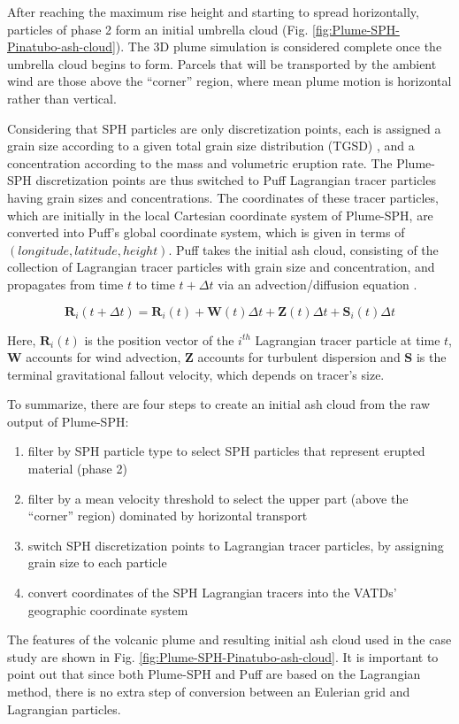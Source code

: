 \documentclass[draft,linenumbers]{agujournal2019}
\begin{document}
After reaching the maximum rise height and starting to spread horizontally, particles of phase 2 form an initial umbrella cloud (Fig. \ref{fig:Plume-SPH-Pinatubo-ash-cloud}). The 3D plume simulation is considered complete once the umbrella cloud begins to form. Parcels that will be transported by the ambient wind are those above the ``corner'' region, where mean plume motion is horizontal rather than vertical.  

Considering that SPH particles are only discretization points, each is assigned a grain size according to a given total grain size distribution (TGSD) \citep{paladio1996tephra}, and a concentration according to the mass and volumetric eruption rate. The Plume-SPH discretization points are thus switched to Puff Lagrangian tracer particles having grain sizes and concentrations. The coordinates of these tracer particles, which are initially in the local Cartesian coordinate system of Plume-SPH, are converted into Puff's global coordinate system, which is given in terms of $(longitude, latitude, height)$. Puff takes the initial ash cloud, consisting of the collection of Lagrangian tracer particles with grain size and concentration, and propagates from time $t$ to time $t+\Delta t$ via an advection/diffusion equation \citep{searcy1998puff}.
\begin{linenomath*}
\begin{equation}
\textbf{R}_i(t+\Delta t) = \textbf{R}_i(t) + \textbf{W}(t)\Delta t + \textbf{Z}(t)\Delta t +  \textbf{S}_i(t) \Delta t
\end{equation}
\end{linenomath*}
Here, $\textbf{R}_i(t)$ is the position vector of the $i^{th}$ Lagrangian tracer particle at time $t$, $\textbf{W}$ accounts for wind advection, $\textbf{Z}$ accounts for turbulent dispersion and $\textbf{S}$ is the terminal gravitational fallout velocity, which depends on tracer's size.

To summarize, there are four steps to create an initial ash cloud from the raw output of Plume-SPH:
\begin{enumerate}
\item filter by SPH particle type to select SPH particles that represent erupted material (phase 2)
\item filter by a mean velocity threshold to select the upper part (above the ``corner'' region) dominated by horizontal transport
\item switch SPH discretization points to Lagrangian tracer particles, by assigning grain size to each particle
\item convert coordinates of the SPH Lagrangian tracers into the VATDs' geographic coordinate system
\end{enumerate}
The features of the volcanic plume and resulting initial ash cloud used in the case study are shown in Fig. \ref{fig:Plume-SPH-Pinatubo-ash-cloud}. It is important to point out that since both Plume-SPH and Puff are based on the Lagrangian method, there is no extra step of conversion between an Eulerian grid and Lagrangian particles.
\end{document}
